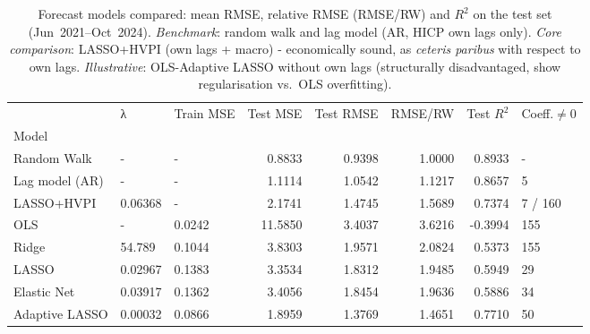 \begin{table}
\caption{Forecast models compared: mean RMSE, relative RMSE (RMSE/RW) and $R^2$ on the test set (Jun~2021--Oct~2024). \emph{Benchmark}: random walk and lag model (AR, HICP own lags only). \emph{Core comparison}: LASSO+HVPI (own lags + macro) - economically sound, as \emph{ceteris paribus} with respect to own lags. \emph{Illustrative}: OLS-Adaptive LASSO without own lags (structurally disadvantaged, show regularisation vs.\ OLS overfitting).}
\label{tab:ergebnisse}
\begin{tabular}{lllrrrrl}
\toprule
 & λ & Train MSE & Test MSE & Test RMSE & RMSE/RW & Test $R^2$ & Coeff.$\neq$0 \\
Model &  &  &  &  &  &  &  \\
\midrule
Random Walk & - & - & 0.8833 & 0.9398 & 1.0000 & 0.8933 & - \\
Lag model (AR) & - & - & 1.1114 & 1.0542 & 1.1217 & 0.8657 & 5 \\
\midrule
LASSO+HVPI & 0.06368 & - & 2.1741 & 1.4745 & 1.5689 & 0.7374 & 7 / 160 \\
\midrule
OLS & - & 0.0242 & 11.5850 & 3.4037 & 3.6216 & -0.3994 & 155 \\
Ridge & 54.789 & 0.1044 & 3.8303 & 1.9571 & 2.0824 & 0.5373 & 155 \\
LASSO & 0.02967 & 0.1383 & 3.3534 & 1.8312 & 1.9485 & 0.5949 & 29 \\
Elastic Net & 0.03917 & 0.1362 & 3.4056 & 1.8454 & 1.9636 & 0.5886 & 34 \\
Adaptive LASSO & 0.00032 & 0.0866 & 1.8959 & 1.3769 & 1.4651 & 0.7710 & 50 \\
\bottomrule
\end{tabular}
\end{table}
